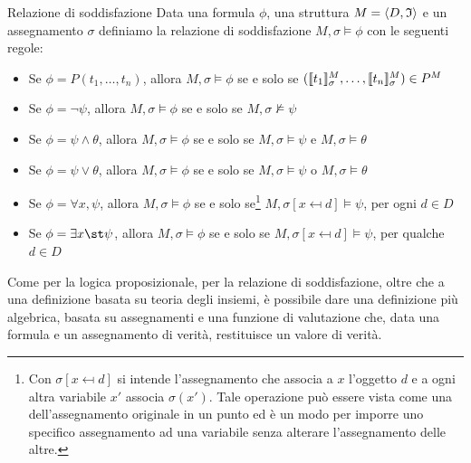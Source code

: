 \begin{definition}{Relazione di soddisfazione}
  Data una formula \(\phi\), una struttura \(M = \langle D, \mathfrak{I} \rangle\) e un assegnamento \(\sigma\) definiamo la relazione di soddisfazione \(M,\sigma\models \phi\) con le seguenti regole:
  \begin{itemize}
    \item Se \(\phi = P(t_1,\ldots,t_n)\), allora \(M,\sigma\models \phi\) se e solo se \((\den{t_1}[M][\sigma], \ldots, \den{t_n}[M][\sigma]) \in P^M\)
    \item Se \(\phi = \neg \psi\), allora \(M,\sigma\models \phi\) se e solo se \(M,\sigma\not\models \psi\)
    \item Se \(\phi = \psi\land\theta\), allora \(M,\sigma\models \phi\) se e solo se \(M,\sigma\models \psi\) e \(M,\sigma\models \theta\)
    \item Se \(\phi = \psi\lor\theta\), allora \(M,\sigma\models \phi\) se e solo se \(M,\sigma\models \psi\) o \(M,\sigma\models \theta\)
    \item Se \(\phi = \forall x, \psi\), allora \(M,\sigma\models \phi\) se e solo se\footnote{Con \(\sigma[x\mapsfrom d]\) si intende l'assegnamento che associa a \(x\) l'oggetto \(d\) e a ogni altra variabile \(x'\) associa \(\sigma(x')\). Tale operazione può essere vista come una  dell'assegnamento originale in un punto ed è un modo per imporre uno specifico assegnamento ad una variabile senza alterare l'assegnamento delle altre.} \(M,\sigma[x \mapsfrom d]\models \psi\), per ogni \(d\in D\)
    \item Se \(\phi = \exists x\st \psi\), allora \(M,\sigma\models \phi\) se e solo se \(M,\sigma[x \mapsfrom d]\models \psi\), per qualche \(d\in D\)
  \end{itemize}
\end{definition}

Come per la logica proposizionale, per la relazione di soddisfazione, oltre che a una definizione basata su teoria degli insiemi, è possibile dare una definizione più algebrica, basata su assegnamenti e una funzione di valutazione che, data una formula e un assegnamento di verità, restituisce un valore di verità. 

